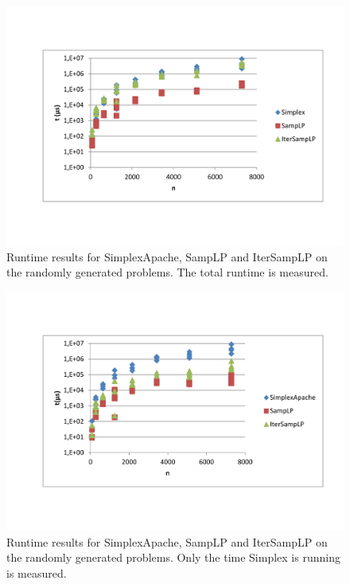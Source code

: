 \documentclass[nocopyrightspace]{acm_proc_article-sp}
\begin{document}
\begin{figure}[h!]
\includegraphics[width=\columnwidth]{../Results/totalruntime.pdf}
\caption{Runtime results for SimplexApache, SampLP and IterSampLP on the randomly generated problems. The total runtime is measured.}
\label{fig:totalruntime}
\end{figure}

\begin{figure}[h!]
\includegraphics[width=\columnwidth]{../Results/runtime_Simplex.pdf}
\caption{Runtime results for SimplexApache, SampLP and IterSampLP on the randomly generated problems. Only the time Simplex is running is measured.}
\label{fig:simplexruntime}
\end{figure}
\end{document}
